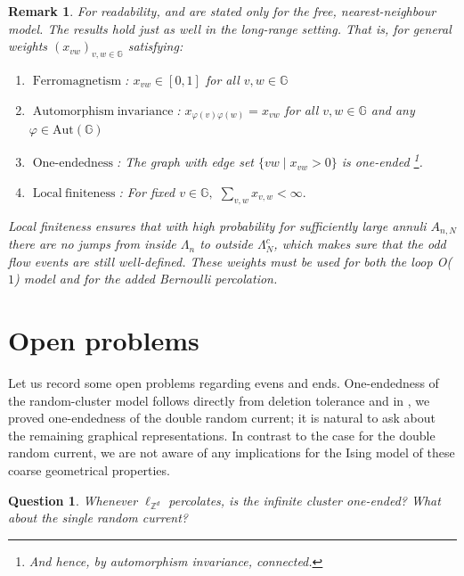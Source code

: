 \documentclass[article,11pt,reqno]{amsart}
\newcommand{\Z}{\mathbb{Z}}
\newcommand{\Prbcur}{\mathbf{P}}
\newtheorem{remark}[theorem]{Remark}
\newtheorem{question}[theorem]{Question}
\begin{document}
\begin{remark}
For readability,  and  are stated only for the free, nearest-neighbour model. %
The results hold just as well in the long-range setting. That is, for general weights $(x_{vw})_{v,w\in \mathbb{G}}$ satisfying:

\begin{enumerate}
    \item[] $\operatorname{Ferromagnetism}$: $x_{vw}\in [0,1]$ for all $v,w\in \mathbb{G}$
    \item[] $\operatorname{Automorphism \;invariance}$: $x_{\varphi(v)\varphi(w)}=x_{vw}$ for all $v,w\in \mathbb{G}$ and any $\varphi\in \mathrm{Aut}(\mathbb{G})$
    \item[] $\operatorname{One-endedness}$: The graph with edge set $\{vw\mid x_{vw}>0\}$ is one-ended \footnote{And hence, by automorphism invariance, connected.}.
    \item[] $\operatorname{Local\; finiteness}$: For fixed $v\in \mathbb{G},$ $\sum_{v,w}x_{v,w}<\infty.$
\end{enumerate}
Local finiteness ensures that with high probability for sufficiently large annuli $A_{n,N}$ there are no jumps from inside $\Lambda_n$ to outside $\Lambda_N^c$, which makes sure that the odd flow events are still well-defined. 
These weights must be used for both the loop O($1$) model and for the added Bernoulli percolation. 
\end{remark}



\section{Open problems}
Let us record some open problems regarding evens and ends. One-endedness of the random-cluster model follows directly from deletion tolerance and in , we proved one-endedness of the double random current; it is natural to ask about the remaining graphical representations. In contrast to the case for the double random current, we are not aware of any implications for the Ising model of these coarse geometrical properties.
 \begin{question}
     Whenever $\ell_{\Z^d}$ percolates, is the infinite cluster one-ended? What about the single random current?
 \end{question}
\end{document}
